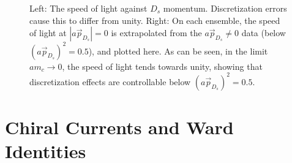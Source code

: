 \documentclass[a4paper,10pt]{article}
\numberwithin{equation}{section}
\begin{document}
\begin{figure}
\begin{subfigure}{.5\textwidth}
  \label{fig:sub2}
\end{subfigure}
\caption{Left: The speed of light against $D_s$ momentum. Discretization errors cause this to differ from unity. Right: On each ensemble, the speed of light at $\left\vert a\vec{p}_{D_s} \right\vert=0$ is extrapolated from the $a\vec{p}_{D_s}\neq 0$ data (below $\left(a\vec{p}_{D_s}\right)^2 =0.5$), and plotted here. As can be seen, in the limit $am_c\to 0$, the speed of light tends towards unity, showing that discretization effects are controllable below $\left(a\vec{p}_{D_s}\right)^2 = 0.5$.}
\label{fig:speedoflight}
\end{figure}





\appendix


\section{Chiral Currents and Ward Identities}
\label{sec:ward}
\end{document}
